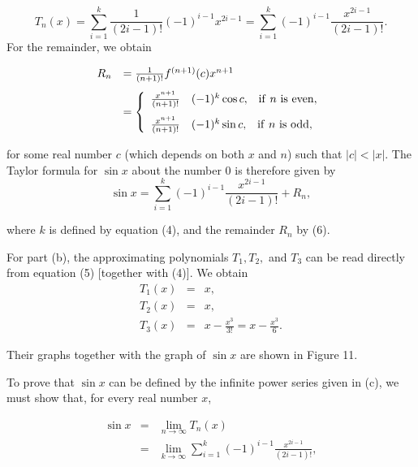 \begin{example}
\begin{equation}
T_n(x) = \sum_{i=1}^k \frac{1}{(2i -1)!} (-1)^{i - 1} x^{2i - 1} 
= \sum_{i=1}^k (-1)^{i- 1} \frac{x^{2i - 1}}{(2i - 1)!} . \label{eq9.8.5}
\end{equation}
\noindent [If $n = 0$, we have the exception $T_0(x) = 0$.] For the remainder, we obtain 

\begin{equation}
\begin{array}{ll}
R_n &= \frac{1}{(n+1)!} f^{(n + 1)} (c) x^{n+1} 
\vspace{.1in}\\
        &= \left \{ \begin{array}{ll}
\frac{x^{n+1}}{(n+1)!} & (-1)^k \cos c, \;\;\;\mathrm{if}~n~\mathrm{is~even}, \vspace{.1in}\\
\frac{x^{n+1}}{(n+1)!} & (-1)^k \sin c,  \;\;\;\mathrm{if}~n~\mathrm{is~odd},
\end{array}
\right .
\end{array}
\label{eq9.8.6}
\end{equation}

\noindent for some real number $c$ (which depends on both $x$ and $n$) such that $|c| < |x|$. The Taylor formula for $\sin x$ about the number 0 is therefore given by 
$$
\sin x = \sum_{i=1}^k (-1)^{i-1} \frac{x^{2i-1}}{(2i-1)!} + R_n ,
$$

\noindent where $k$ is defined by equation (4), and the remainder $R_n$ by (6).

For part (b), the approximating polynomials $T_1, T_2,$ and $T_3$ can be read directly from equation (5) [together with (4)]. We obtain 
\begin{eqnarray*}
T_1(x) &=& x, \\
T_2(x) &=& x, \\
T_3(x) &=& x - \frac{x^3}{3!} = x - \frac{x^3}{6} .
\end{eqnarray*}

\noindent Their graphs together with the graph of $\sin x$ are shown in Figure 11.


To prove that $\sin x$ can be defined by the infinite power series given in (c), we must show that, for every real number $x$,

\begin{eqnarray*}
\sin x &=& \lim_{n \rightarrow \infty} T_n(x) \\
         &=& \lim_{k \rightarrow \infty} \sum_{i=1}^k (-1)^{i-1} \frac{x^{2i-1}}{(2i-1)!} ,
\end{eqnarray*}


\end{example}
